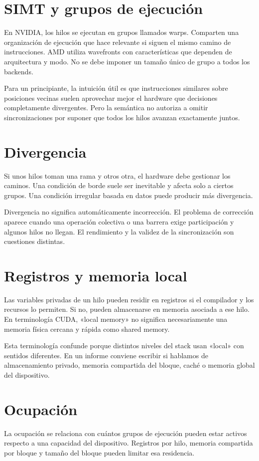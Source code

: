 \documentclass[12pt,a4paper,oneside]{report}
\begin{document}
\section{SIMT y grupos de ejecución}
En NVIDIA, los hilos se ejecutan en grupos llamados warps. Comparten una organización de ejecución que hace relevante si siguen el mismo camino de instrucciones. AMD utiliza wavefronts con características que dependen de arquitectura y modo. No se debe imponer un tamaño único de grupo a todos los backends. \cite{cuda,hip}

Para un principiante, la intuición útil es que instrucciones similares sobre posiciones vecinas suelen aprovechar mejor el hardware que decisiones completamente divergentes. Pero la semántica no autoriza a omitir sincronizaciones por suponer que todos los hilos avanzan exactamente juntos.

\section{Divergencia}
Si unos hilos toman una rama y otros otra, el hardware debe gestionar los caminos. Una condición de borde suele ser inevitable y afecta solo a ciertos grupos. Una condición irregular basada en datos puede producir más divergencia.

Divergencia no significa automáticamente incorrección. El problema de corrección aparece cuando una operación colectiva o una barrera exige participación y algunos hilos no llegan. El rendimiento y la validez de la sincronización son cuestiones distintas.

\section{Registros y memoria local}
Las variables privadas de un hilo pueden residir en registros si el compilador y los recursos lo permiten. Si no, pueden almacenarse en memoria asociada a ese hilo. En terminología CUDA, «local memory» no significa necesariamente una memoria física cercana y rápida como shared memory.

Esta terminología confunde porque distintos niveles del stack usan «local» con sentidos diferentes. En un informe conviene escribir si hablamos de almacenamiento privado, memoria compartida del bloque, caché o memoria global del dispositivo.

\section{Ocupación}
La ocupación se relaciona con cuántos grupos de ejecución pueden estar activos respecto a una capacidad del dispositivo. Registros por hilo, memoria compartida por bloque y tamaño del bloque pueden limitar esa residencia.
\end{document}
